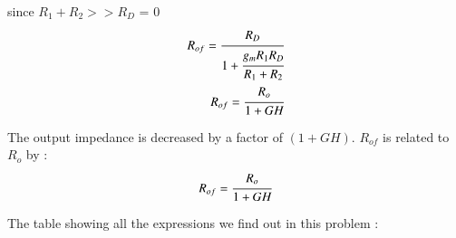 \begin{enumerate}[label=\thesubsection.\arabic*.,ref=\thesubsection.\theenumi]
since $R_{1}+R_{2}>>R_{D}$ \implies {} = 0\\

\begin{align}
R_{of} = \cfrac{R_{D}}{1 + \cfrac{ g_{m}R_{1}R_{D}}{R_{1}+R_{2}}}\\
R_{of} = \cfrac{R_{o}}{1 + GH}
\end{align}

The output impedance is decreased by a factor of $(1+GH)$.
$R_{of}$ is related to $R_{o}$ by :\\
\begin{align}
R_{of} = \cfrac{R_{o}}{1 + GH}
\end{align}


The table showing all the expressions we find out in this problem :

\begin{table}[!ht]
\centering

\caption{}
\label{table}
\end{table}


\end{enumerate}